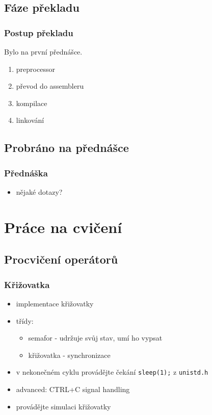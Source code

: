 \subsection{Fáze překladu}

\begin{frame}
	\frametitle{Postup překladu}
	Bylo na první přednášce.
	\begin{enumerate}
		\item{preprocessor}
		\item{převod do assembleru}
		\item{kompilace}
		\item{linkování}
	\end{enumerate}
\end{frame}

\subsection{Probráno na přednášce}

\begin{frame}
	\frametitle{Přednáška}
	\begin{itemize}
		\item{nějaké dotazy?}
	\end{itemize}
\end{frame}

\section{Práce na cvičení}
\subsection{Procvičení operátorů}

\begin{frame}
	\frametitle{Křižovatka}
	\begin{itemize}
		\item{implementace křižovatky}
		\item{třídy:}
		\begin{itemize}
			\item{semafor - udržuje svůj stav, umí ho vypsat}
			\item{křižovatka - synchronizace}
		\end{itemize}
		\item{v nekonečném cyklu provádějte čekání \texttt{sleep(1);} z \texttt{unistd.h}}
		\item{advanced: CTRL+C signal handling}
		\item{provádějte simulaci křižovatky}
	\end{itemize}
\end{frame}

